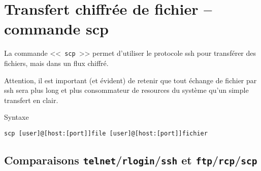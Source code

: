 \section{Transfert chiffr{\'e}e de fichier -- commande scp}
La commande  <<~\texttt{scp}~>> permet d'utiliser le protocole ssh pour transf{\'e}rer des fichiers, mais dans un flux chiffr{\'e}. 

Attention, il est important (et {\'e}vident) de retenir que tout {\'e}change de fichier par ssh sera plus long et plus consommateur de resources du syst{\`e}me qu'un simple transfert en clair.
\begin{definition}{Syntaxe}
\begin{verbatim}
scp [user]@[host:[port]]file [user]@[host:[port]]fichier 
\end{verbatim}
\end{definition}



\subsection{Comparaisons \texttt{telnet}/\texttt{rlogin}/\texttt{ssh} et \texttt{ftp}/\texttt{rcp}/\texttt{scp}}


